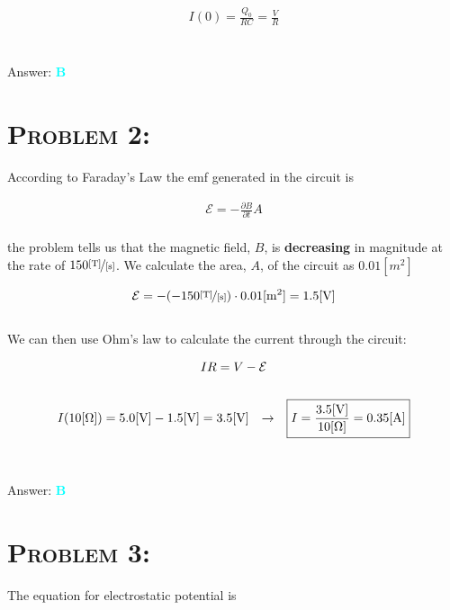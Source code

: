 \documentclass{article}
\begin{document}
\begin{gather}
\boxed{I(0) = \frac{Q_{0}}{RC} = \frac{V}{R}}\nonumber
\end{gather}
\\\\
Answer: \textbf{\textcolor{cyan}B}\\


\section{\textsc{Problem 2:}} According to Faraday's Law the emf generated in the circuit is

\begin{gather}
\mathcal{E} = -\frac{\partial B}{\partial t} A
\end{gather}
\\
the problem tells us that the magnetic field, $B$, is \textbf{decreasing} in magnitude at the rate of $150\unitfrac{[T]}{[s]}$. We calculate the area, $A$, of the circuit as $0.01\unit{[m^{2}]}$

\begin{gather}
\mathcal{E} = -(-150\unitfrac{[T]}{[s]}) \cdot 0.01\unit{[m^{2}]} = 1.5\unit{[V]}\nonumber
\end{gather}
\\
We can then use Ohm's law to calculate the current through the circuit:

\begin{gather}
IR  = V - \mathcal{E}\\
\nonumber\\
I (10\unit{[\Omega]}) = 5.0\unit{[V]} - 1.5\unit{[V]} = 3.5\unit{[V]} \hspace{.1in} \rightarrow \hspace{.1in} \boxed{I = \frac{3.5\unit{[V]}}{10\unit{[\Omega]}} = 0.35\unit{[A]}}\nonumber
\end{gather}
\\\\
Answer: \textbf{\textcolor{cyan}B}\\


\section{\textsc{Problem 3:}} The equation for electrostatic potential is
\end{document}
